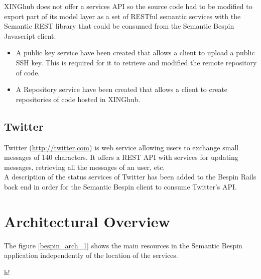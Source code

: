 XINGhub does not offer a services API so the source code had to be modified to export part of its model layer as a set
of RESTful semantic services with the Semantic REST library that could be consumed from the Semantic Bespin Javascript
client:

\begin{itemize}
\item A public key service have been created that allows a client to upload a public SSH key. This is required for it to
  retrieve and modified the remote repository of code.
\item A Repository service have been created that allows a client to create repositories of code hosted in XINGhub.
\end{itemize}

\subsection{Twitter}

Twitter (\url{http://twitter.com}) is web service allowing users to exchange small messages of 140 characters. It offers a REST API with services
for updating messages, retrieving all the messages of an user, etc.\\
A description of the status services of Twitter has been added to the Bespin Rails back end in order for the Semantic
Bespin client to consume Twitter's API.

\section{Architectural Overview}

The figure \ref{bespin_arch_1} shows the main resources in the Semantic Bespin application independently of the location
of the services.

\begin{table}{h!}
\noindent{}
\caption{Main resources in the Semantic Bespin application}
\label{bespin_arch_1}
\end{table}

